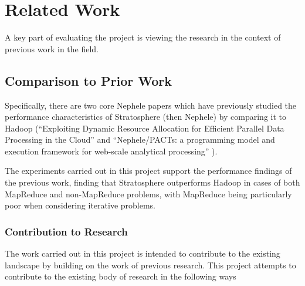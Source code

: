 \section{Related Work}
A key part of evaluating the project is viewing the research in the context of previous work in the field.

\subsection{Comparison to Prior Work}
Specifically, there are two core Nephele papers which have previously studied the performance characteristics of Stratosphere (then Nephele) by comparing it to Hadoop (``Exploiting Dynamic Resource Allocation for Efficient Parallel Data Processing in the Cloud'' \cite{warneke2011exploiting} and ``Nephele/PACTs: a programming model and execution framework for web-scale analytical processing'' \cite{battre2010socc}). 

The experiments carried out in this project support the performance findings of the previous work, finding that Stratosphere outperforms Hadoop in cases of both MapReduce and non-MapReduce problems, with MapReduce being particularly poor when considering iterative problems.


\subsubsection{Contribution to Research}
The work carried out in this project is intended to contribute to the existing landscape by building on the work of previous research. This project attempts to contribute to the existing body of research in the following ways

